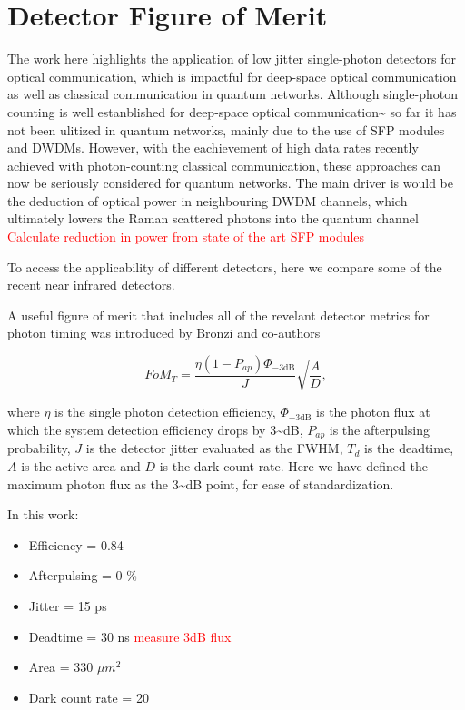 \documentclass{optica-article}
\begin{document}
\hypertarget{detector-figure-of-merit}{%
\section{Detector Figure of Merit}\label{detector-figure-of-merit}}

The work here highlights the application of low jitter single-photon detectors for optical communication, which is impactful for deep-space optical communication as well as classical communication in quantum networks. Although single-photon counting is well estanblished for deep-space optical communication\textasciitilde{}\cite{Laser lunar, DSOC} so far it has not been ulitized in quantum networks, mainly due to the use of SFP modules and DWDMs. However, with the eachievement of high data rates recently achieved with photon-counting classical communication, these approaches can now be seriously considered for quantum networks. The main driver is would be the deduction of optical power in neighbouring DWDM channels, which ultimately lowers the Raman scattered photons into the quantum channel \cite{EraerdsRaman}
\textcolor{red}{Calculate reduction in power from state of the art SFP modules}

To access the applicability of different detectors, here we compare some of the recent near infrared detectors.

A useful figure of merit that includes all of the revelant detector metrics for photon timing was introduced by Bronzi and co-authors \cite{Bronzi2016}

\[FoM_T = \frac{\eta  (1 - P_{ap})\Phi_{-3 \text{dB}}}{J} \sqrt{\frac{A}{D}},\]

where \(\eta\) is the single photon detection efficiency, \(\Phi_{-3 \text{dB}}\) is the photon flux at which the system detection efficiency drops by 3\textasciitilde dB, \(P_{ap}\) is the afterpulsing probability, \(J\) is the detector jitter evaluated as the FWHM, \(T_d\) is the deadtime, \(A\) is the active area and \(D\) is the dark count rate. Here we have defined the maximum photon flux as the 3\textasciitilde dB point, for ease of standardization.

In this work:

\begin{itemize}
\tightlist
\item
  Efficiency = 0.84
\item
  Afterpulsing = 0 \%
\item
  Jitter = 15 ps
\item
  Deadtime = 30 ns \textcolor{red}{measure 3dB flux}
\item
  Area = 330 \(\mu m^2\)
\item
  Dark count rate = 20\Hz
\end{itemize}
\end{document}
